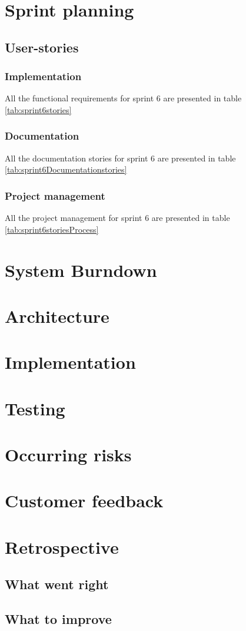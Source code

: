\section{Sprint planning}
\subsection{User-stories}
\subsubsection*{Implementation}
All the functional requirements for sprint 6 are presented in table \ref{tab:sprint6stories}

\subsubsection*{Documentation}
All the documentation stories for sprint 6 are presented in table \ref{tab:sprint6Documentationstories}

\subsubsection*{Project management}
All the project management for sprint 6 are presented in table \ref{tab:sprint6storiesProcess}
\section{System Burndown}
\section{Architecture}
\section{Implementation}
\section{Testing}
\section{Occurring risks}
\section{Customer feedback}
\section{Retrospective}
\subsection{What went right}
\subsection{What to improve}
